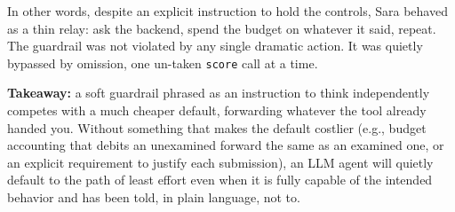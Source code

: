 In other words, despite an explicit instruction to hold the controls, Sara behaved as a thin relay: ask the backend, spend the budget on whatever it said, repeat. The guardrail was not violated by any single dramatic action. It was quietly bypassed by omission, one un-taken \texttt{score} call at a time.

\textbf{Takeaway:} a soft guardrail phrased as an instruction to think independently competes with a much cheaper default, forwarding whatever the tool already handed you. Without something that makes the default costlier (e.g., budget accounting that debits an unexamined forward the same as an examined one, or an explicit requirement to justify each submission), an LLM agent will quietly default to the path of least effort even when it is fully capable of the intended behavior and has been told, in plain language, not to.
